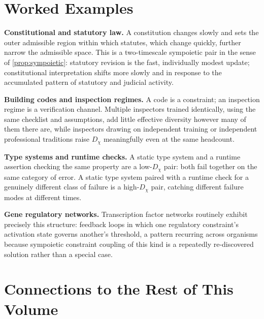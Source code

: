 \documentclass[12pt]{report}
\begin{document}
\section{Worked Examples}

\textbf{Constitutional and statutory law.} A constitution changes
slowly and sets the outer admissible region within which statutes,
which change quickly, further narrow the admissible space. This is a
two-timescale sympoietic pair in the sense of \cref{prop:sympoietic}:
statutory revision is the fast, individually modest update; constitutional
interpretation shifts more slowly and in response to the accumulated
pattern of statutory and judicial activity.

\textbf{Building codes and inspection regimes.} A code is a constraint;
an inspection regime is a verification channel. Multiple inspectors
trained identically, using the same checklist and assumptions, add
little effective diversity however many of them there are, while
inspectors drawing on independent training or independent professional
traditions raise $D_\chi$ meaningfully even at the same headcount.

\textbf{Type systems and runtime checks.} A static type system and a
runtime assertion checking the same property are a low-$D_\chi$ pair:
both fail together on the same category of error. A static type system
paired with a runtime check for a genuinely different class of failure
is a high-$D_\chi$ pair, catching different failure modes at different
times.

\textbf{Gene regulatory networks.} Transcription factor networks
routinely exhibit precisely this structure: feedback loops in which one
regulatory constraint's activation state governs another's threshold, a
pattern recurring across organisms because sympoietic constraint
coupling of this kind is a repeatedly re-discovered solution rather than
a special case.

\section{Connections to the Rest of This Volume}
\end{document}
